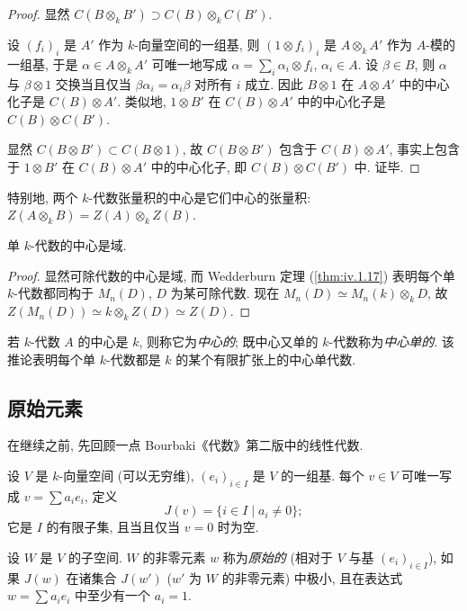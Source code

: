 \begin{proof}
显然 $C(B\otimes_k B')\supset C(B)\otimes_k C(B')$.

设 $(f_i)_i$ 是 $A'$ 作为 $k$-向量空间的一组基, 则 $(1\otimes f_i)_i$ 是 $A\otimes_k A'$ 作为 $A$-模的一组基, 于是 $\alpha\in A\otimes_k A'$ 可唯一地写成 $\alpha=\sum_i\alpha_i\otimes f_i$, $\alpha_i\in A$. 设 $\beta\in B$, 则 $\alpha$ 与 $\beta\otimes 1$ 交换当且仅当 $\beta\alpha_i=\alpha_i\beta$ 对所有 $i$ 成立. 因此 $B\otimes 1$ 在 $A\otimes A'$ 中的中心化子是 $C(B)\otimes A'$. 类似地, $1\otimes B'$ 在 $C(B)\otimes A'$ 中的中心化子是 $C(B)\otimes C(B')$.

显然 $C(B\otimes B')\subset C(B\otimes 1)$, 故 $C(B\otimes B')$ 包含于 $C(B)\otimes A'$, 事实上包含于 $1\otimes B'$ 在 $C(B)\otimes A'$ 中的中心化子, 即 $C(B)\otimes C(B')$ 中. 证毕.
\end{proof}

特别地, 两个 $k$-代数张量积的中心是它们中心的张量积: $Z(A\otimes_k B)=Z(A)\otimes_k Z(B)$.

\begin{corollary}\label{cor:iv.2.4}
单 $k$-代数的中心是域.
\end{corollary}

\begin{proof}
显然可除代数的中心是域, 而 Wedderburn 定理 (\ref{thm:iv.1.17}) 表明每个单 $k$-代数都同构于 $M_n(D)$, $D$ 为某可除代数. 现在 $M_n(D)\simeq M_n(k)\otimes_k D$, 故 $Z(M_n(D))\simeq k\otimes_k Z(D)\simeq Z(D)$.
\end{proof}

若 $k$-代数 $A$ 的中心是 $k$, 则称它为\emph{中心的}; 既中心又单的 $k$-代数称为\emph{中心单的}. 该推论表明每个单 $k$-代数都是 $k$ 的某个有限扩张上的中心单代数.

\subsection*{原始元素}

在继续之前, 先回顾一点 Bourbaki《代数》第二版中的线性代数.

设 $V$ 是 $k$-向量空间 (可以无穷维), $(e_i)_{i\in I}$ 是 $V$ 的一组基. 每个 $v\in V$ 可唯一写成 $v=\sum a_ie_i$, 定义
\[
J(v)=\{i\in I\mid a_{i}\neq0\};
\]
它是 $I$ 的有限子集, 且当且仅当 $v=0$ 时为空.

设 $W$ 是 $V$ 的子空间. $W$ 的非零元素 $w$ 称为\emph{原始的} (相对于 $V$ 与基 $(e_i)_{i\in I}$), 如果 $J(w)$ 在诸集合 $J(w')$ ($w'$ 为 $W$ 的非零元素) 中极小, 且在表达式 $w=\sum a_ie_i$ 中至少有一个 $a_i=1$.


